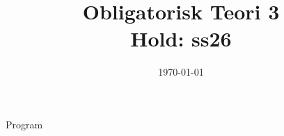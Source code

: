 \documentclass[11pt,aspectratio=169]{beamer}
\title{Obligatorisk Teori 3 \\
Hold: ss26}
\date{\today}
\begin{document}
\begin{frame}
  \titlepage
\end{frame}

\begin{frame}{Program}
  \tableofcontents
\end{frame}

















%

%

%

%

%

%

%

%

%
\end{document}
